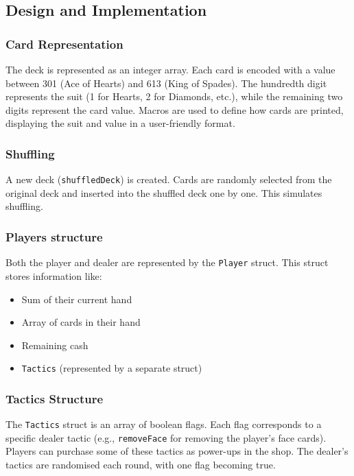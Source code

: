 \documentclass[9pt,a4paper,twoside]{tau-class/tau}
\begin{document}
    \subsection{Design and Implementation} 
    
    \subsubsection{Card Representation}    
    The deck is represented as an integer array. Each card is encoded with a value between 301 (Ace of Hearts) and 613 (King of Spades). The hundredth digit represents the suit (1 for Hearts, 2 for Diamonds, etc.), while the remaining two digits represent the card value. Macros are used to define how cards are printed, displaying the suit and value in a user-friendly format. 
    
    \subsubsection{Shuffling}  
    A new deck (\texttt{shuffledDeck}) is created. Cards are randomly selected from the original deck and inserted into the shuffled deck one by one. This simulates shuffling. 
    
    \subsubsection{Players structure}
    Both the player and dealer are represented by the \texttt{Player} struct. This struct stores information like:  
    \begin{itemize}
        \item Sum of their current hand
        \item Array of cards in their hand
        \item Remaining cash
        \item \texttt{Tactics} (represented by a separate struct)
    \end{itemize}
    
    \subsubsection{Tactics Structure}    
    The \texttt{Tactics} struct is an array of boolean flags. Each flag corresponds to a specific dealer tactic (e.g., \texttt{removeFace} for removing the player's face cards). Players can purchase some of these tactics as power-ups in the shop. The dealer's tactics are randomised each round, with one flag becoming true. 
\end{document}
